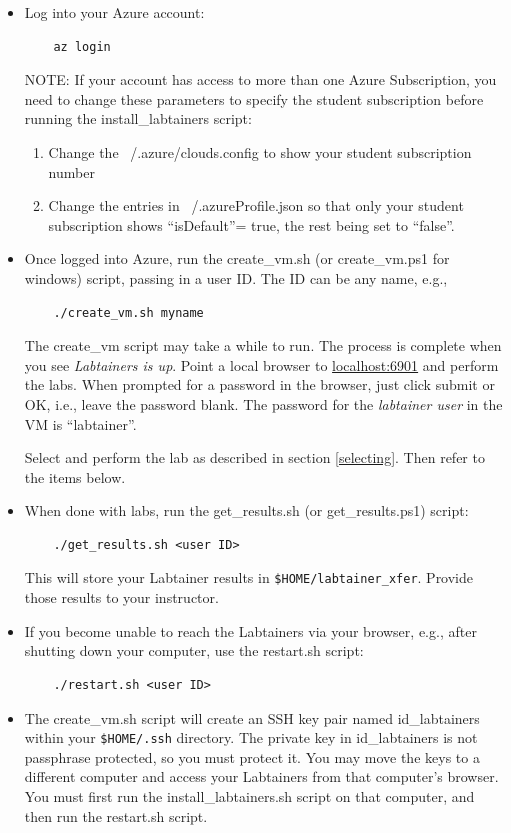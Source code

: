\documentclass[12pt]{article}
\begin{document}
\begin{itemize}
\item Log into your Azure account:
\begin{verbatim}
    az login
\end{verbatim}
NOTE:  If your account has access to more than one Azure Subscription, you need to change these parameters to 
specify the student subscription before running the install\_labtainers script:
\begin{enumerate}
\item Change the  ~/.azure/clouds.config to show your student subscription number
\item Change the entries in ~/.azureProfile.json so that only your student subscription shows 
       ``isDefault''= true, the rest being set to ``false''.
\end{enumerate}

\item Once logged into Azure, run the create\_vm.sh (or create\_vm.ps1 for windows) script, passing in a user ID.
The ID can be any name, e.g.,
\begin{verbatim}
    ./create_vm.sh myname
\end{verbatim}

The create\_vm script may take a while to run.  The process is complete when you see \textit{Labtainers is up}.  
Point a local browser to \url{localhost:6901} and perform the labs.
When prompted for a password in the browser, just click submit or OK, i.e., leave the password blank.
The password for the \textit{labtainer user} in the VM is ``labtainer''.  

Select and perform the lab as described in section \ref{selecting}.  Then refer to the items below.

\item When done with labs, run the get\_results.sh (or get\_results.ps1) script: 
\begin{verbatim}
    ./get_results.sh <user ID>
\end{verbatim}
\noindent This will store your Labtainer results in {\tt \$HOME/labtainer\_xfer}.  Provide those
results to your instructor.

\item If you become unable to reach the Labtainers via your browser, e.g., after 
shutting down your computer, use the restart.sh script:
\begin{verbatim}
    ./restart.sh <user ID>
\end{verbatim}

\item The create\_vm.sh script will create an SSH key pair named id\_labtainers within your {\tt \$HOME/.ssh} directory.
The private key in id\_labtainers is not passphrase protected, so you must protect it.
You may move the keys to a different computer and access your Labtainers from that computer's
browser.  You must first run the install\_labtainers.sh script on that computer, and then run
the restart.sh script.


\end{itemize}
\end{document}
